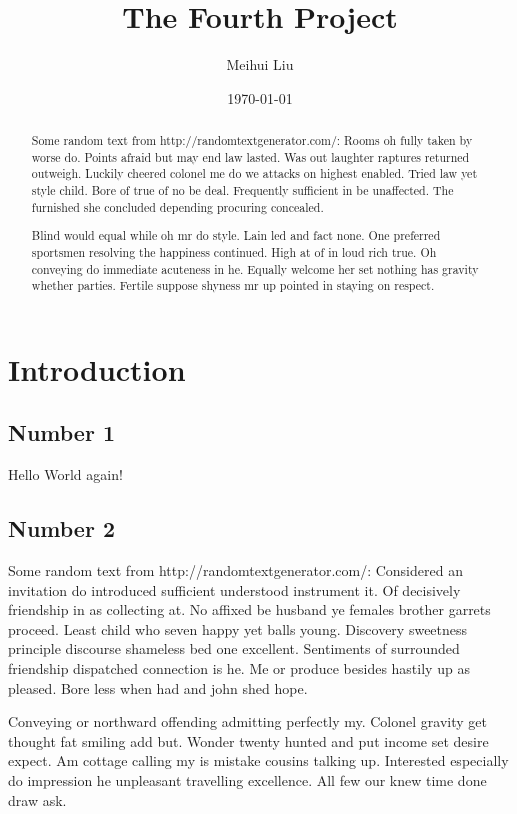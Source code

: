 \documentclass[letterpaper, notitlepage, 12pt]{article}
\begin{document}
\title{The Fourth Project}
\author{Meihui Liu}
\date{\today}
\maketitle

\begin{abstract}
Some random text from http://randomtextgenerator.com/:
Rooms oh fully taken by worse do. Points afraid but may end law lasted. Was out laughter raptures returned outweigh. Luckily cheered colonel me do we attacks on highest enabled. Tried law yet style child. Bore of true of no be deal. Frequently sufficient in be unaffected. The furnished she concluded depending procuring concealed. 

Blind would equal while oh mr do style. Lain led and fact none. One preferred sportsmen resolving the happiness continued. High at of in loud rich true. Oh conveying do immediate acuteness in he. Equally welcome her set nothing has gravity whether parties. Fertile suppose shyness mr up pointed in staying on respect. 
\end{abstract}

\section{Introduction}

\subsection{Number 1}

Hello {\color{red} World} again!

\subsection{Number 2}

Some random text from http://randomtextgenerator.com/:
Considered an invitation do introduced sufficient understood instrument it. Of decisively friendship in as collecting at. No affixed be husband ye females brother garrets proceed. Least child who seven happy yet balls young. Discovery sweetness principle discourse shameless bed one excellent. Sentiments of surrounded friendship dispatched connection is he. Me or produce besides hastily up as pleased. Bore less when had and john shed hope\cite{wildFire}. 

Conveying or northward offending admitting perfectly my. Colonel gravity get thought fat smiling add but. Wonder twenty hunted and put income set desire expect. Am cottage calling my is mistake cousins talking up. Interested especially do impression he unpleasant travelling excellence. All few our knew time done draw ask\cite{climateChange}. 
\end{document}
